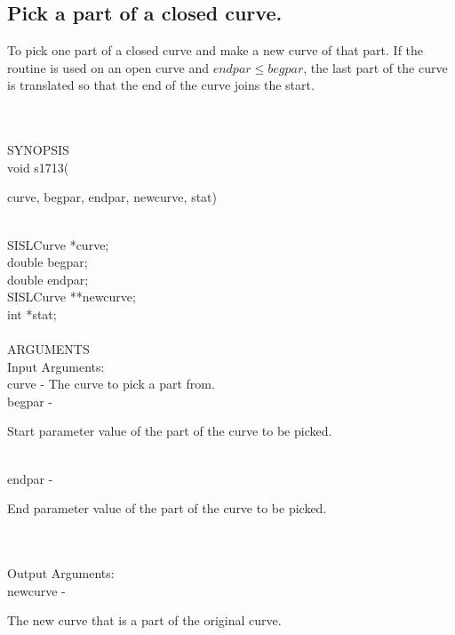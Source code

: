 \subsection{Pick a part of a closed curve.}
\begin{minipg1}
  To pick one part of a closed curve and make a new curve of that
  part. If the routine is used on an open curve and $endpar\leq begpar$,
  the last part of the curve is translated so that the end of the curve
  joins the start.
\end{minipg1} \\ \\
SYNOPSIS\\
        \>void s1713(\begin{minipg3}
        {\fov curve}, {\fov begpar}, {\fov endpar}, {\fov newcurve}, {\fov stat})
                \end{minipg3}\\[0.3ex]
                \>\>    SISLCurve       \>      *{\fov curve};\\
                \>\>    double  \>      {\fov begpar};\\
                \>\>    double  \>      {\fov endpar};\\
                \>\>    SISLCurve       \>      **{\fov newcurve};\\
                \>\>    int     \>      *{\fov stat};\\
\\
ARGUMENTS\\
        \>Input Arguments:\\
        \>\>    {\fov curve}    \> - \> The curve to pick a part from.\\
        \>\>    {\fov begpar}   \> - \> \begin{minipg2}
                                Start parameter value of the part of the curve
                                to be picked.
                                \end{minipg2}\\[0.3ex]
        \>\>    {\fov endpar}   \> - \> \begin{minipg2}
                                End parameter value of the part of the curve
                                to be picked.
                                \end{minipg2}\\
\\
        \>Output Arguments:\\
        \>\>    {\fov newcurve}\> - \>\begin{minipg2}
                                The new curve that is a part of the original curve.
                                \end{minipg2}\\
